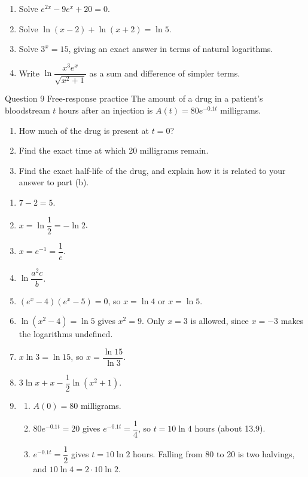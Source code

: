 \documentclass[11pt]{article}
\begin{document}
\begin{enumerate}[leftmargin=*,itemsep=2pt,start=5]
  \item Solve $e^{2x}-9e^{x}+20=0$.\work{2.8cm}
  \item Solve $\ln(x-2)+\ln(x+2)=\ln5$.\work{2.8cm}
  \item Solve $3^{x}=15$, giving an exact answer in terms of natural logarithms.\work{2.8cm}
  \item Write $\ln\dfrac{x^3e^{x}}{\sqrt{x^2+1}}$ as a sum and difference of simpler terms.\work{2.8cm}
\end{enumerate}

\begin{frbox}{Question 9 \textperiodcentered{} Free-response practice}
The amount of a drug in a patient's bloodstream $t$ hours after an injection is $A(t)=80e^{-0.1t}$ milligrams.
\begin{enumerate}[label=(\alph*),leftmargin=*,itemsep=2pt]
  \item How much of the drug is present at $t=0$?\work{2.6cm}
  \item Find the exact time at which 20 milligrams remain.\work{2.6cm}
  \item Find the exact half-life of the drug, and explain how it is related to your answer to part (b).\work{2.6cm}
\end{enumerate}
\end{frbox}

\newpage
\begin{solbox}
\begin{enumerate}[leftmargin=*,itemsep=4pt]
  \item $7-2=5$.
  \item $x=\ln\dfrac12=-\ln2$.
  \item $x=e^{-1}=\dfrac1e$.
  \item $\ln\dfrac{a^2c}{b}$.
  \item $(e^{x}-4)(e^{x}-5)=0$, so $x=\ln4$ or $x=\ln5$.
  \item $\ln\!\left(x^2-4\right)=\ln5$ gives $x^2=9$. Only $x=3$ is allowed, since $x=-3$ makes the logarithms undefined.
  \item $x\ln3=\ln15$, so $x=\dfrac{\ln15}{\ln3}$.
  \item $3\ln x+x-\dfrac12\ln\!\left(x^2+1\right)$.
  \item \begin{enumerate}[label=(\alph*),leftmargin=*,itemsep=3pt]
    \item $A(0)=80$ milligrams.
    \item $80e^{-0.1t}=20$ gives $e^{-0.1t}=\dfrac14$, so $t=10\ln4$ hours (about 13.9).
    \item $e^{-0.1t}=\dfrac12$ gives $t=10\ln2$ hours. Falling from 80 to 20 is two halvings, and $10\ln4=2\cdot10\ln2$.
  \end{enumerate}
\end{enumerate}
\end{solbox}
\end{document}
